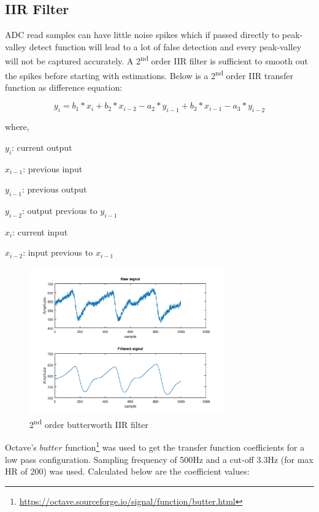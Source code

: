 	\subsection{IIR Filter}

		ADC read samples can have little noise spikes which if passed directly to peak-valley detect function will lead to a lot of false detection and every peak-valley will not be captured accurately. A 2\textsuperscript{nd} order IIR filter is sufficient to smooth out the spikes before starting with estimations. Below is a 2\textsuperscript{nd} order IIR transfer function as difference equation:
		
		\[
		y_i = b_1*x_i + b_2*x_{i-2} - a_2*y_{i-1} + b_3*x_{i-1} - a_3*y_{i-2}
		\]
		
		where,
		
		$y_i$: current output
		
		$x_{i-1}$: previous input
		
		$y_{i-1}$: previous output
		
		$y_{i-2}$: output previous to $y_{i-1}$
		
		$x_i$: current input
		
		$x_{i-2}$: input previous to $x_{i-1}$
		
		
		\begin{figure}[ht!]
			\centering
			\includegraphics[width=0.75\textwidth]{../common/algo/filter.png}
			\caption{2\textsuperscript{nd} order butterworth IIR filter}
			\label{fig:filter}
		\end{figure}
		
		Octave's $butter$ function\footnote{\url{https://octave.sourceforge.io/signal/function/butter.html}} was used to get the transfer function coefficients for a low pass configuration. Sampling frequency of 500Hz and a cut-off 3.3Hz (for max HR of 200) was used. Calculated below are the coefficient values:
		
